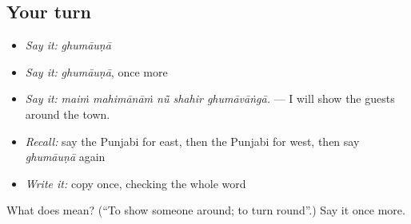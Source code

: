 \subsection*{Your turn}
\begin{itemize}
\raggedright
  \item \emph{Say it:} \emph{ghumāuṇā}
  \item \emph{Say it:} \emph{ghumāuṇā}, once more
  \item \emph{Say it:} \emph{maiṁ mahimānāṁ nū̃ shahir ghumāvāṅgā.} — I will show the guests around the town.
  \item \emph{Recall:} say the Punjabi for east, then the Punjabi for west, then say \emph{ghumāuṇā} again
  \item \emph{Write it:} copy \textbf{} once, checking the whole word
\end{itemize}

\begin{tcolorbox}[breakable,colback=teal!4,colframe=teal!35!black,title={Before you move on}]
What does  mean? (\textquotedblleft{}To show someone around; to turn round\textquotedblright{}.) Say it once more.
\end{tcolorbox}
